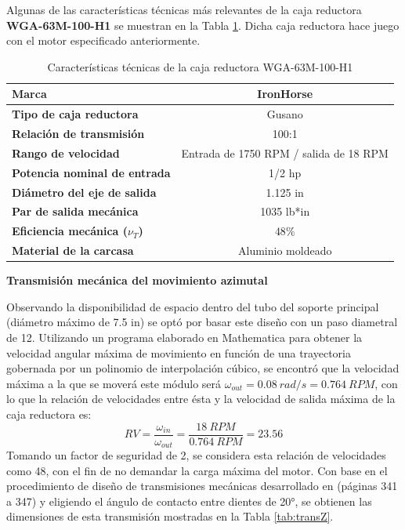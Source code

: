 Algunas de las características técnicas más relevantes de la caja reductora \textbf{WGA-63M-100-H1} se muestran en la Tabla \ref{tab:caja_red}. Dicha caja reductora hace juego con el motor especificado anteriormente.
\begin{table}[H]
	\centering
	\caption{Características técnicas de la caja reductora WGA-63M-100-H1 \cite{DDA2}}
	\begin{tabular}{|l|p{12.93em}|}
		\hline
		\textbf{Marca} & \multicolumn{1}{c|}{IronHorse} \\
		\hline
		\textbf{Tipo de caja reductora} & \multicolumn{1}{c|}{Gusano} \\
		\hline
		\textbf{Relación de transmisión} & \multicolumn{1}{c|}{100:1} \\
		\hline
		\textbf{Rango de velocidad} & \multicolumn{1}{c|}{Entrada de 1750 RPM / salida de 18 RPM} \\
		\hline
		\textbf{Potencia nominal de entrada} & \multicolumn{1}{c|}{1/2 hp} \\
		\hline
		\textbf{Diámetro del eje de salida} & \multicolumn{1}{c|}{1.125 in} \\
		\hline
		\textbf{Par de salida mecánica} & \multicolumn{1}{c|}{1035 lb*in} \\
		\hline
		\textbf{Eficiencia mecánica ($ \nu_T $)} & \multicolumn{1}{c|}{$ 48\% $} \\
		\hline
		\textbf{Material de la carcasa} & \multicolumn{1}{c|}{Aluminio moldeado} \\
		\hline
	\end{tabular}%
	\label{tab:caja_red}%
\end{table}%
\textbf{Transmisión mecánica del movimiento azimutal}

Observando la disponibilidad de espacio dentro del tubo del soporte principal (diámetro máximo de 7.5 in) se optó por basar este diseño con un paso diametral de 12. Utilizando un programa elaborado en Mathematica para obtener la velocidad angular máxima de movimiento en función de una trayectoria gobernada por un polinomio de interpolación cúbico, se encontró que la velocidad máxima a la que se moverá este módulo será $ \omega_{out} = 0.08\ rad/s = 0.764\ RPM $, con lo que la relación de velocidades entre ésta y la velocidad de salida máxima de la caja reductora es:
\begin{equation}
	RV = \frac{\omega_{in}}{\omega_{out}} = \frac{18\ RPM}{0.764\ RPM} = 23.56
\end{equation}
Tomando un factor de seguridad de 2, se considera esta relación de velocidades como 48, con el fin de no demandar la carga máxima del motor. Con base en el procedimiento de diseño de transmisiones mecánicas desarrollado en \cite{DDA3} (páginas 341 a 347) y eligiendo el ángulo de contacto entre dientes de 20°, se obtienen las dimensiones de esta transmisión mostradas en la Tabla \ref{tab:transZ}.

